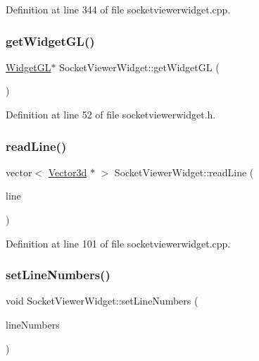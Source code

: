 Definition at line 344 of file socketviewerwidget.\+cpp.

\mbox{\label{class_socket_viewer_widget_af3d70a0610a981a537c2e1596a685ee0}} 
\subsubsection{\texorpdfstring{getWidgetGL()}{getWidgetGL()}}
{\footnotesize\ttfamily \mbox{\hyperlink{class_widget_g_l}{Widget\+GL}}$\ast$ Socket\+Viewer\+Widget\+::get\+Widget\+GL (\begin{DoxyParamCaption}{ }\end{DoxyParamCaption})\hspace{0.3cm}{\ttfamily [inline]}}



Definition at line 52 of file socketviewerwidget.\+h.

\mbox{\label{class_socket_viewer_widget_a5387d149cd3faff65c83efe3a1da28c4}} 
\subsubsection{\texorpdfstring{readLine()}{readLine()}}
{\footnotesize\ttfamily vector$<$ \mbox{\hyperlink{struct_vector3d}{Vector3d}} $\ast$ $>$ Socket\+Viewer\+Widget\+::read\+Line (\begin{DoxyParamCaption}\item[{Q\+String \&}]{line }\end{DoxyParamCaption})}



Definition at line 101 of file socketviewerwidget.\+cpp.

\mbox{\label{class_socket_viewer_widget_a2a538e85ff7a127f14dace6c5b10471d}} 
\subsubsection{\texorpdfstring{setLineNumbers()}{setLineNumbers()}}
{\footnotesize\ttfamily void Socket\+Viewer\+Widget\+::set\+Line\+Numbers (\begin{DoxyParamCaption}\item[{int}]{line\+Numbers }\end{DoxyParamCaption})\hspace{0.3cm}{\ttfamily [inline]}}



